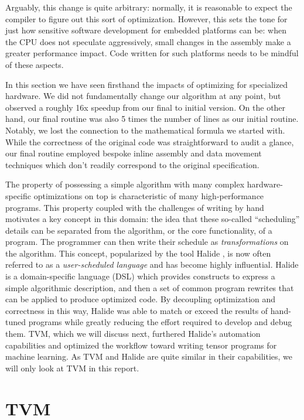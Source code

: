 \documentclass[acmsmall, nonacm=true]{acmart}
\begin{document}
Arguably, this change is quite arbitrary: normally, it is reasonable to expect the compiler to figure out this sort of optimization. However, this sets the tone for just how sensitive software development for embedded platforms can be: when the CPU does not speculate aggressively, small changes in the assembly make a greater performance impact. Code written for such platforms needs to be mindful of these aspects.

In this section we have seen firsthand the impacts of optimizing for specialized hardware. We did not fundamentally change our algorithm at any point, but observed a roughly 16x speedup from our final to initial version. On the other hand, our final routine was also 5 times the number of lines as our initial routine. Notably, we lost the connection to the mathematical formula we started with. While the correctness of the original code was straightforward to audit a glance, our final routine employed bespoke inline assembly and data movement techniques which don't readily correspond to the original specification. 

The property of possessing a simple algorithm with many complex hardware-specific optimizations on top is characteristic of many high-performance programs. This property coupled with the challenges of writing by hand motivates a key concept in this domain: the idea that these so-called ``scheduling'' details can be separated from the algorithm, or the core functionality, of a program. The programmer can then write their schedule as \textit{transformations} on the algorithm. This concept, popularized by the tool Halide \cite{halide}, is now often referred to as a \textit{user-scheduled language} and has become highly influential. Halide is a domain-specific language (DSL) which provides constructs to express a simple algorithmic description, and then a set of common program rewrites that can be applied to produce optimized code. By decoupling optimization and correctness in this way, Halide was able to match or exceed the results of hand-tuned programs while greatly reducing the effort required to develop and debug them. TVM, which we will discuss next, furthered Halide's automation capabilities and optimized the workflow toward writing tensor programs for machine learning. As TVM and Halide are quite similar in their capabilities, we will only look at TVM in this report.

\section{TVM}
\end{document}
